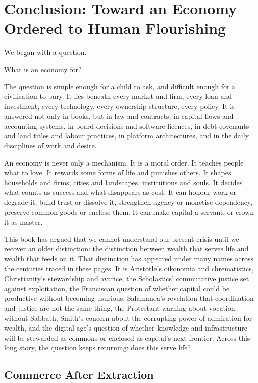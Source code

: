 \documentclass[11pt,a4paper,oneside]{book}
\begin{document}
\chapter*{Conclusion: Toward an Economy Ordered to Human Flourishing}

We began with a question.

What is an economy for?

The question is simple enough for a child to ask, and difficult enough for a civilisation to bury. It lies beneath every market and firm, every loan and investment, every technology, every ownership structure, every policy. It is answered not only in books, but in law and contracts, in capital flows and accounting systems, in board decisions and software licences, in debt covenants and land titles and labour practices, in platform architectures, and in the daily disciplines of work and desire.

An economy is never only a mechanism. It is a moral order. It teaches people what to love. It rewards some forms of life and punishes others. It shapes households and firms, cities and landscapes, institutions and souls. It decides what counts as success and what disappears as cost. It can honour work or degrade it, build trust or dissolve it, strengthen agency or monetise dependency, preserve common goods or enclose them. It can make capital a servant, or crown it as master.

This book has argued that we cannot understand our present crisis until we recover an older distinction: the distinction between wealth that serves life and wealth that feeds on it. That distinction has appeared under many names across the centuries traced in these pages. It is Aristotle's oikonomia and chrematistics, Christianity's stewardship and avarice, the Scholastics' commutative justice set against exploitation, the Franciscan question of whether capital could be productive without becoming usurious, Salamanca's revelation that coordination and justice are not the same thing, the Protestant warning about vocation without Sabbath, Smith's concern about the corrupting power of admiration for wealth, and the digital age's question of whether knowledge and infrastructure will be stewarded as commons or enclosed as capital's next frontier. Across this long story, the question keeps returning: does this serve life?

\section*{Commerce After Extraction}
\end{document}
